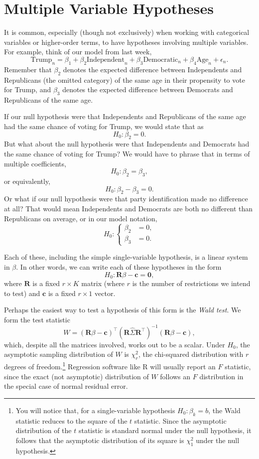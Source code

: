 \documentclass[12pt,oneside,openany]{book}
\let\rmarkdownfootnote\footnote%
\def\footnote{\protect\rmarkdownfootnote}
\begin{document}
\section{Multiple Variable
Hypotheses}\label{multiple-variable-hypotheses}

It is common, especially (though not exclusively) when working with
categorical variables or higher-order terms, to have hypotheses
involving multiple variables. For example, think of our model from last
week, \[
\text{Trump}_n = \beta_1 + \beta_2 \text{Independent}_n + \beta_3 \text{Democratic}_n + \beta_4 \text{Age}_n + \epsilon_n.
\] Remember that \(\beta_2\) denotes the expected difference between
Independents and Republicans (the omitted category) of the same age in
their propensity to vote for Trump, and \(\beta_3\) denotes the expected
difference between Democrats and Republicans of the same age.

If our null hypothesis were that Independents and Republicans of the
same age had the same chance of voting for Trump, we would state that as
\[
H_0 : \beta_2 = 0.
\] But what about the null hypothesis were that Independents and
Democrats had the same chance of voting for Trump? We would have to
phrase that in terms of multiple coefficients, \[
H_0 : \beta_2 = \beta_3,
\] or equivalently, \[
H_0 : \beta_2 - \beta_3 = 0.
\] Or what if our null hypothesis were that party identification made no
difference at all? That would mean Independents and Democrats are both
no different than Republicans on average, or in our model notation, \[
H_0 : \left\{ \begin{aligned}
\beta_2 &= 0, \\
\beta_3 &= 0.
\end{aligned} \right.
\]

Each of these, including the simple single-variable hypothesis, is a
linear system in \(\beta\). In other words, we can write each of these
hypotheses in the form \[
H_0 : \mathbf{R} \beta - \mathbf{c} = \mathbf{0},
\] where \(\mathbf{R}\) is a fixed \(r \times K\) matrix (where \(r\) is
the number of restrictions we intend to test) and \(\mathbf{c}\) is a
fixed \(r \times 1\) vector.

Perhaps the easiest way to test a hypothesis of this form is the
\emph{Wald test}. We form the test statistic \[
W = (\mathbf{R} \beta - \mathbf{c})^\top  (\mathbf{R} \hat{\Sigma} \mathbf{R}^\top)^{-1} (\mathbf{R} \beta - \mathbf{c}),
\] which, despite all the matrices involved, works out to be a scalar.
Under \(H_0\), the asymptotic sampling distribution of \(W\) is
\(\chi^2_r\), the chi-squared distribution with \(r\) degrees of
freedom.\footnote{You will notice that, for a single-variable hypothesis
  \(H_0 : \beta_k = b\), the Wald statistic reduces to the square of the
  \(t\) statistic. Since the asymptotic distribution of the \(t\)
  statistic is standard normal under the null hypothesis, it follows
  that the asymptotic distribution of its square is \(\chi^2_1\) under
  the null hypothesis.} Regression software like R will usually report
an \(F\) statistic, since the exact (not asymptotic) distribution of
\(W\) follows an \(F\) distribution in the special case of normal
residual error.
\end{document}
